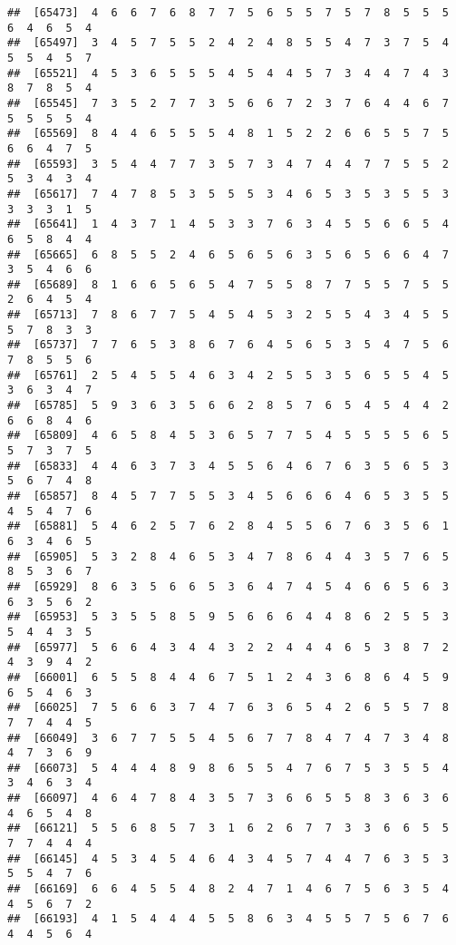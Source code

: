 \documentclass[
]{book}
\begin{document}
\begin{verbatim}
##  [65473]  4  6  6  7  6  8  7  7  5  6  5  5  7  5  7  8  5  5  5  6  4  6  5  4
##  [65497]  3  4  5  7  5  5  2  4  2  4  8  5  5  4  7  3  7  5  4  5  5  4  5  7
##  [65521]  4  5  3  6  5  5  5  4  5  4  4  5  7  3  4  4  7  4  3  8  7  8  5  4
##  [65545]  7  3  5  2  7  7  3  5  6  6  7  2  3  7  6  4  4  6  7  5  5  5  5  4
##  [65569]  8  4  4  6  5  5  5  4  8  1  5  2  2  6  6  5  5  7  5  6  6  4  7  5
##  [65593]  3  5  4  4  7  7  3  5  7  3  4  7  4  4  7  7  5  5  2  5  3  4  3  4
##  [65617]  7  4  7  8  5  3  5  5  5  3  4  6  5  3  5  3  5  5  3  3  3  3  1  5
##  [65641]  1  4  3  7  1  4  5  3  3  7  6  3  4  5  5  6  6  5  4  6  5  8  4  4
##  [65665]  6  8  5  5  2  4  6  5  6  5  6  3  5  6  5  6  6  4  7  3  5  4  6  6
##  [65689]  8  1  6  6  5  6  5  4  7  5  5  8  7  7  5  5  7  5  5  2  6  4  5  4
##  [65713]  7  8  6  7  7  5  4  5  4  5  3  2  5  5  4  3  4  5  5  5  7  8  3  3
##  [65737]  7  7  6  5  3  8  6  7  6  4  5  6  5  3  5  4  7  5  6  7  8  5  5  6
##  [65761]  2  5  4  5  5  4  6  3  4  2  5  5  3  5  6  5  5  4  5  3  6  3  4  7
##  [65785]  5  9  3  6  3  5  6  6  2  8  5  7  6  5  4  5  4  4  2  6  6  8  4  6
##  [65809]  4  6  5  8  4  5  3  6  5  7  7  5  4  5  5  5  5  6  5  5  7  3  7  5
##  [65833]  4  4  6  3  7  3  4  5  5  6  4  6  7  6  3  5  6  5  3  5  6  7  4  8
##  [65857]  8  4  5  7  7  5  5  3  4  5  6  6  6  4  6  5  3  5  5  4  5  4  7  6
##  [65881]  5  4  6  2  5  7  6  2  8  4  5  5  6  7  6  3  5  6  1  6  3  4  6  5
##  [65905]  5  3  2  8  4  6  5  3  4  7  8  6  4  4  3  5  7  6  5  8  5  3  6  7
##  [65929]  8  6  3  5  6  6  5  3  6  4  7  4  5  4  6  6  5  6  3  6  3  5  6  2
##  [65953]  5  3  5  5  8  5  9  5  6  6  6  4  4  8  6  2  5  5  3  5  4  4  3  5
##  [65977]  5  6  6  4  3  4  4  3  2  2  4  4  4  6  5  3  8  7  2  4  3  9  4  2
##  [66001]  6  5  5  8  4  4  6  7  5  1  2  4  3  6  8  6  4  5  9  6  5  4  6  3
##  [66025]  7  5  6  6  3  7  4  7  6  3  6  5  4  2  6  5  5  7  8  7  7  4  4  5
##  [66049]  3  6  7  7  5  5  4  5  6  7  7  8  4  7  4  7  3  4  8  4  7  3  6  9
##  [66073]  5  4  4  4  8  9  8  6  5  5  4  7  6  7  5  3  5  5  4  3  4  6  3  4
##  [66097]  4  6  4  7  8  4  3  5  7  3  6  6  5  5  8  3  6  3  6  4  6  5  4  8
##  [66121]  5  5  6  8  5  7  3  1  6  2  6  7  7  3  3  6  6  5  5  7  7  4  4  4
##  [66145]  4  5  3  4  5  4  6  4  3  4  5  7  4  4  7  6  3  5  3  5  5  4  7  6
##  [66169]  6  6  4  5  5  4  8  2  4  7  1  4  6  7  5  6  3  5  4  4  5  6  7  2
##  [66193]  4  1  5  4  4  4  5  5  8  6  3  4  5  5  7  5  6  7  6  4  4  5  6  4

\end{verbatim}
\end{document}
